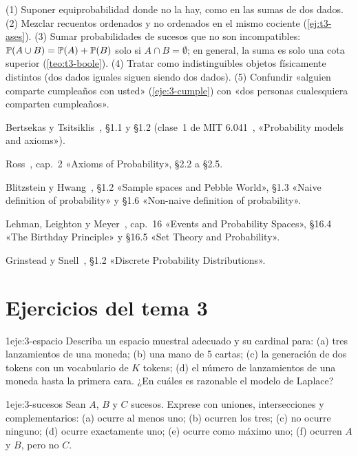 \begin{observacion}
(1) Suponer equiprobabilidad donde no la hay, como en las sumas de dos dados. (2) Mezclar recuentos ordenados y no ordenados en el mismo cociente (\cref{ej:t3-ases}). (3) Sumar probabilidades de sucesos que no son incompatibles: $\mathbb{P}(A\cup B)=\mathbb{P}(A)+\mathbb{P}(B)$ solo si $A\cap B=\emptyset$; en general, la suma es solo una cota superior (\cref{teo:t3-boole}). (4) Tratar como indistinguibles objetos físicamente distintos (dos dados iguales siguen siendo dos dados). (5) Confundir «alguien comparte cumpleaños con usted» (\cref{eje:3-cumple}) con «dos personas cualesquiera comparten cumpleaños».
\end{observacion}

\begin{lecturas}
\item Bertsekas y Tsitsiklis~\cite{bt}, §1.1 y §1.2 (clase~1 de MIT 6.041~\cite{mit6041f10}, «Probability models and axioms»).
\item Ross~\cite{ross}, cap.~2 «Axioms of Probability», §2.2 a §2.5.
\item Blitzstein y Hwang~\cite{bh}, §1.2 «Sample spaces and Pebble World», §1.3 «Naive definition of probability» y §1.6 «Non-naive definition of probability».
\item Lehman, Leighton y Meyer~\cite{mcs}, cap.~16 «Events and Probability Spaces», §16.4 «The Birthday Principle» y §16.5 «Set Theory and Probability».
\item Grinstead y Snell~\cite{gs}, §1.2 «Discrete Probability Distributions».
\end{lecturas}

\section*{Ejercicios del tema 3}

\begin{ejercicio}{1}{eje:3-espacio}
Describa un espacio muestral adecuado y su cardinal para: (a) tres lanzamientos de una moneda; (b) una mano de 5 cartas; (c) la generación de dos tokens con un vocabulario de $K$ tokens; (d) el número de lanzamientos de una moneda hasta la primera cara. ¿En cuáles es razonable el modelo de Laplace?
\end{ejercicio}

\begin{ejercicio}{1}{eje:3-sucesos}
Sean $A$, $B$ y $C$ sucesos. Exprese con uniones, intersecciones y complementarios: (a) ocurre al menos uno; (b) ocurren los tres; (c) no ocurre ninguno; (d) ocurre exactamente uno; (e) ocurre como máximo uno; (f) ocurren $A$ y $B$, pero no $C$.
\end{ejercicio}

